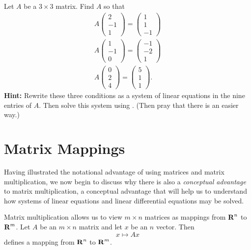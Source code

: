 \begin{exercise} \label{c4.1.12}
Let $A$ be a $3\times 3$ matrix.  Find $A$ so that
\begin{eqnarray*}
A\left(\begin{array}{r} 2 \\ -1 \\ 1 \end{array}\right) =
\left(\begin{array}{r} 1 \\ 1  \\ -1 \end{array}\right) \\
A\left(\begin{array}{r} 1 \\ -1 \\ 0 \end{array}\right) =
\left(\begin{array}{r} -1 \\ -2 \\ 1 \end{array}\right)\\
A\left(\begin{array}{r} 0 \\ 2 \\ 4 \end{array}\right) =
\left(\begin{array}{r} 5 \\ 1 \\ 1 \end{array}\right).
\end{eqnarray*}
{\bf Hint:} Rewrite these three conditions as a system of linear
equations in the nine entries of $A$.  Then solve this system
using \Matlabp.  (Then pray that there is an easier way.)
\end{exercise}


\section{Matrix Mappings}   \label{s:4.2}

Having illustrated the notational advantage of using matrices
and matrix multiplication, we now begin to discuss why there
is also a {\em conceptual advantage\/} to matrix
multiplication, a conceptual advantage that will help
us to understand how systems of linear equations and linear
differential equations may be solved.

Matrix multiplication allows us to view $m\times n$ matrices as
mappings from $\mbox{$\bf{R}$}^n$ to $\mbox{$\bf{R}$}^m$.  Let $A$ be an $m\times n$
matrix and let $x$ be an $n$ vector.  Then
\[
x \mapsto Ax
\]
defines a mapping from $\mbox{$\bf{R}$}^n$ to $\mbox{$\bf{R}$}^m$.

